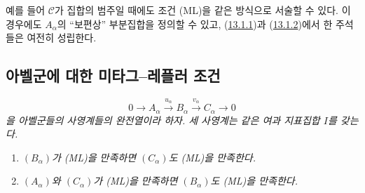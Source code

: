 \begin{remark}[13.1.3]
\label{0.13.1.3-fr}
예를 들어 $\mathcal C$가 집합의 범주일 때에도 조건 (ML)을 같은 방식으로
서술할 수 있다. 이 경우에도 $A_\alpha$의 ``보편상'' 부분집합을 정의할
수 있고, (\hyperref[0.13.1.1-fr]{13.1.1})과
(\hyperref[0.13.1.2-fr]{13.1.2})에서 한 주석들은 여전히 성립한다.
\end{remark}

\subsection{아벨군에 대한 미타그--레플러 조건}
\label{subsection:0.13.2-fr}

\begin{proposition}[13.2.1]
\label{0.13.2.1-fr}
\emph{
\[
0\longrightarrow A_\alpha\xrightarrow{u_\alpha}B_\alpha
\xrightarrow{v_\alpha}C_\alpha\longrightarrow0
\]
을 아벨군들의 사영계들의 완전열이라 하자. 세 사영계는 같은 여과
지표집합 $I$를 갖는다.}
\begin{enumerate}
\item[\emph{(i)}] \emph{$(B_\alpha)$가 (ML)을 만족하면
$(C_\alpha)$도 (ML)을 만족한다.}
\item[\emph{(ii)}] \emph{$(A_\alpha)$와 $(C_\alpha)$가 (ML)을
만족하면 $(B_\alpha)$도 (ML)을 만족한다.}
\end{enumerate}
\end{proposition}

